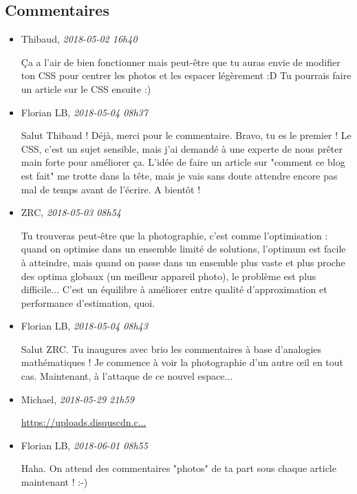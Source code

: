 \hypertarget{commentaires}{%
\subsection{Commentaires}\label{commentaires}}

\begin{itemize}
\item
  Thibaud, \emph{2018-05-02 16h40}

  Ça a l'air de bien fonctionner mais peut-être que tu auras envie de
  modifier ton CSS pour centrer les photos et les espacer légèrement :D
  Tu pourrais faire un article sur le CSS ensuite :)
\item
  Florian LB, \emph{2018-05-04 08h37}

  Salut Thibaud ! Déjà, merci pour le commentaire. Bravo, tu es le
  premier ! Le CSS, c'est un sujet sensible, mais j'ai demandé à une
  experte de nous prêter main forte pour améliorer ça. L'idée de faire
  un article sur "comment ce blog est fait" me trotte dans la tête, mais
  je vais sans doute attendre encore pas mal de temps avant de l'écrire.
  A bientôt !
\item
  ZRC, \emph{2018-05-03 08h54}

  Tu trouveras peut-être que la photographie, c'est comme l'optimisation
  : quand on optimise dans un ensemble limité de solutions, l'optimum
  est facile à atteindre, mais quand on passe dans un ensemble plus
  vaste et plus proche des optima globaux (un meilleur appareil photo),
  le problème est plus difficile... C'est un équilibre à améliorer entre
  qualité d'approximation et performance d'estimation, quoi.
\item
  Florian LB, \emph{2018-05-04 08h43}

  Salut ZRC. Tu inaugures avec brio les commentaires à base d'analogies
  mathématiques ! Je commence à voir la photographie d'un autre œil en
  tout cas. Maintenant, à l'attaque de ce nouvel espace...
\item
  Michael, \emph{2018-05-29 21h59}

  \href{https://uploads.disquscdn.com/images/d3d52c79db3c778c55746cf8982dd515cea75ba04db4e5912de5a2f20df6195c.png}{https://uploads.disquscdn.c...}
\item
  Florian LB, \emph{2018-06-01 08h55}

  Haha. On attend des commentaires "photos" de ta part sous chaque
  article maintenant ! :-)
\end{itemize}
